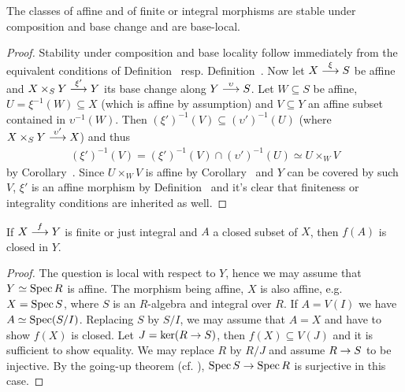 \documentclass[a4paper,parskip=half,numbers=enddot, DIV=12]{scrreprt}
\begin{document}
\begin{cor}
    The classes of affine and of finite or integral morphisms are stable under composition and base change and are base-local.
\end{cor}
\begin{proof}
	Stability under composition and base locality follow immediately from the equivalent conditions of Definition~ resp. Definition~. Now let $X\morphism[\xi]S$ be affine and $X\times_SY\morphism[\xi']Y$ its base change along $Y\morphism[\upsilon] S$. Let $W\subseteq S$ be affine, $U=\xi^{-1}(W)\subseteq X$ (which is affine by assumption) and $V\subseteq Y$ an affine subset contained in $\upsilon^{-1}(W)$. Then $(\xi')^{-1}(V)\subseteq(\upsilon')^{-1}(U)$ (where $X\times_SY\morphism[\upsilon']X$) and thus
	\begin{align*}
		(\xi')^{-1}(V)=(\xi')^{-1}(V)\cap (\upsilon')^{-1}(U)\simeq U\times_WV
	\end{align*}
	by Corollary~. Since $U\times_WV$ is affine by Corollary~ and $Y$ can be covered by such $V$, $\xi'$ is an affine morphism by Definition~ and it's clear that finiteness or integrality conditions are inherited as well.
\end{proof}
\begin{prop}
    If $X\morphism[f] Y$ is finite or just integral and $A$ a closed subset of $X$, then $f(A)$ is closed in $Y$.
\end{prop}
\begin{proof}
    The question is local with respect to $Y$, hence we may assume that $Y\simeq \operatorname{Spec} R$ is affine. The morphism being affine, $X$ is also affine, e.g. $X= \operatorname{Spec} S$, where $S$ is an $R$-algebra and integral over $R$. If $A=V(I)$ we have $A\simeq \operatorname{Spec}(S/I)$. Replacing $S$ by $S/I$, we may assume that $A=X$ and have to show $f(X)$ is closed. Let $J = \ker(R\morphism S)$, then $f(X)\subseteq V(J)$ and it is sufficient to show equality. We may replace $R$ by $R/J$ and assume $R\morphism S$ to be injective. By the going-up theorem (cf. \cite[Theorem~7]{alg1}), $\Spec S\morphism \Spec R$ is surjective in this case. 
\end{proof}
\end{document}
